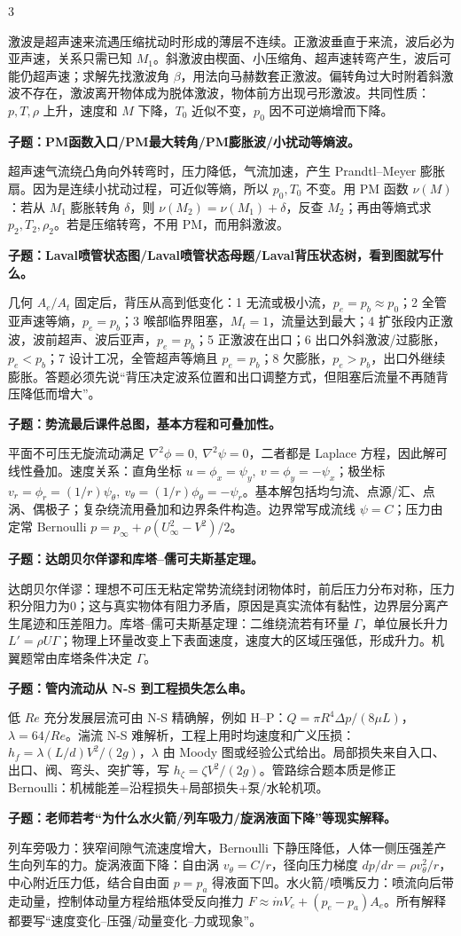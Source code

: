 \documentclass[a4paper]{article}
\newcommand{\qt}[1]{\vspace{0.10pt}\colorbox{Q}{\parbox{\dimexpr\linewidth-2\fboxsep}{\color{white}\bfseries #1}}\par}
\newcommand{\ans}[1]{\colorbox{G}{\parbox{\dimexpr\linewidth-2\fboxsep}{#1}}\par}
\begin{document}
\begin{multicols}{3}
\ans{激波是超声速来流遇压缩扰动时形成的薄层不连续。正激波垂直于来流，波后必为亚声速，关系只需已知 $M_1$。斜激波由楔面、小压缩角、超声速转弯产生，波后可能仍超声速；求解先找激波角 $\beta$，用法向马赫数套正激波。偏转角过大时附着斜激波不存在，激波离开物体成为脱体激波，物体前方出现弓形激波。共同性质：$p,T,\rho$ 上升，速度和 $M$ 下降，$T_0$ 近似不变，$p_0$ 因不可逆熵增而下降。}
\qt{子题：PM函数入口/PM最大转角/PM膨胀波/小扰动等熵波。}
\ans{超声速气流绕凸角向外转弯时，压力降低，气流加速，产生 Prandtl--Meyer 膨胀扇。因为是连续小扰动过程，可近似等熵，所以 $p_0,T_0$ 不变。用 PM 函数 $\nu(M)$：若从 $M_1$ 膨胀转角 $\delta$，则 $\nu(M_2)=\nu(M_1)+\delta$，反查 $M_2$；再由等熵式求 $p_2,T_2,\rho_2$。若是压缩转弯，不用 PM，而用斜激波。}
\qt{子题：Laval喷管状态图/Laval喷管状态母题/Laval背压状态树，看到图就写什么。}
\ans{几何 $A_e/A_t$ 固定后，背压从高到低变化：1 无流或极小流，$p_e=p_b\approx p_0$；2 全管亚声速等熵，$p_e=p_b$；3 喉部临界阻塞，$M_t=1$，流量达到最大；4 扩张段内正激波，波前超声、波后亚声，$p_e=p_b$；5 正激波在出口；6 出口外斜激波/过膨胀，$p_e<p_b$；7 设计工况，全管超声等熵且 $p_e=p_b$；8 欠膨胀，$p_e>p_b$，出口外继续膨胀。答题必须先说“背压决定波系位置和出口调整方式，但阻塞后流量不再随背压降低而增大”。}
\qt{子题：势流最后课件总图，基本方程和可叠加性。}
\ans{平面不可压无旋流动满足 $\nabla^2\phi=0,\ \nabla^2\psi=0$，二者都是 Laplace 方程，因此解可线性叠加。速度关系：直角坐标 $u=\phi_x=\psi_y,\ v=\phi_y=-\psi_x$；极坐标 $v_r=\phi_r=(1/r)\psi_\theta,\ v_\theta=(1/r)\phi_\theta=-\psi_r$。基本解包括均匀流、点源/汇、点涡、偶极子；复杂绕流用叠加和边界条件构造。边界常写成流线 $\psi=C$；压力由定常 Bernoulli $p=p_\infty+\rho(U_\infty^2-V^2)/2$。}
\qt{子题：达朗贝尔佯谬和库塔--儒可夫斯基定理。}
\ans{达朗贝尔佯谬：理想不可压无粘定常势流绕封闭物体时，前后压力分布对称，压力积分阻力为0；这与真实物体有阻力矛盾，原因是真实流体有黏性，边界层分离产生尾迹和压差阻力。库塔--儒可夫斯基定理：二维绕流若有环量 $\Gamma$，单位展长升力 $L'=\rho U\Gamma$；物理上环量改变上下表面速度，速度大的区域压强低，形成升力。机翼题常由库塔条件决定 $\Gamma$。}
\qt{子题：管内流动从 N-S 到工程损失怎么串。}
\ans{低 $Re$ 充分发展层流可由 N-S 精确解，例如 H--P：$Q=\pi R^4\Delta p/(8\mu L)$，$\lambda=64/Re$。湍流 N-S 难解析，工程上用时均速度和广义压损：$h_f=\lambda(L/d)V^2/(2g)$，$\lambda$ 由 Moody 图或经验公式给出。局部损失来自入口、出口、阀、弯头、突扩等，写 $h_\zeta=\zeta V^2/(2g)$。管路综合题本质是修正 Bernoulli：机械能差=沿程损失+局部损失+泵/水轮机项。}
\qt{子题：老师若考“为什么水火箭/列车吸力/旋涡液面下降”等现实解释。}
\ans{列车旁吸力：狭窄间隙气流速度增大，Bernoulli 下静压降低，人体一侧压强差产生向列车的力。旋涡液面下降：自由涡 $v_\theta=C/r$，径向压力梯度 $dp/dr=\rho v_\theta^2/r$，中心附近压力低，结合自由面 $p=p_a$ 得液面下凹。水火箭/喷嘴反力：喷流向后带走动量，控制体动量方程给瓶体受反向推力 $F\approx\dot m V_e+(p_e-p_a)A_e$。所有解释都要写“速度变化--压强/动量变化--力或现象”。}

\end{multicols}
\end{document}
